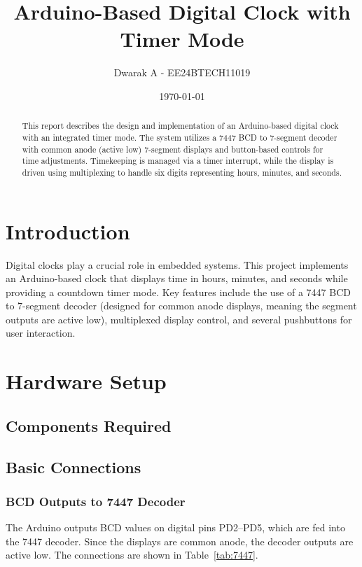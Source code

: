 \documentclass[a4paper,12pt]{article}
\title{Arduino-Based Digital Clock with Timer Mode}
\author{Dwarak A - EE24BTECH11019}
\date{\today}
\begin{document}
\maketitle

\begin{abstract}
This report describes the design and implementation of an Arduino-based digital clock with an integrated timer mode. The system utilizes a 7447 BCD to 7-segment decoder with common anode (active low) 7-segment displays and button-based controls for time adjustments. Timekeeping is managed via a timer interrupt, while the display is driven using multiplexing to handle six digits representing hours, minutes, and seconds.
\end{abstract}

\newpage
\tableofcontents
\newpage

\section{Introduction}
Digital clocks play a crucial role in embedded systems. This project implements an Arduino-based clock that displays time in hours, minutes, and seconds while providing a countdown timer mode. Key features include the use of a 7447 BCD to 7-segment decoder (designed for common anode displays, meaning the segment outputs are active low), multiplexed display control, and several pushbuttons for user interaction.

\section{Hardware Setup}
\subsection{Components Required}

\newpage

\subsection{Basic Connections}

\subsubsection{BCD Outputs to 7447 Decoder}
The Arduino outputs BCD values on digital pins PD2--PD5, which are fed into the 7447 decoder. Since the displays are common anode, the decoder outputs are active low. The connections are shown in Table~\ref{tab:7447}.

\end{document}
